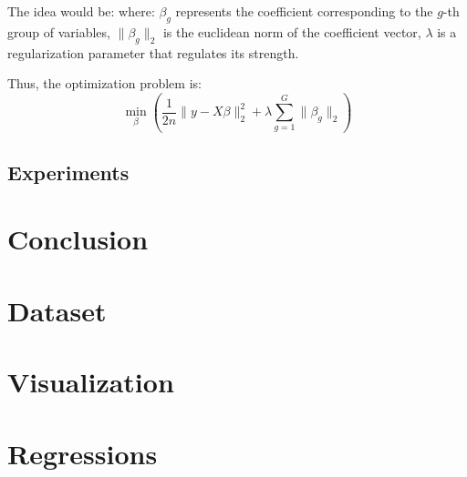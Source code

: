 \documentclass[a4paper, 8pt]{article}
\begin{document}
\begin{multicols}{2}
The idea would be: where: $\beta_g$ represents the coefficient corresponding to the $g$-th group of variables, $\lVert \beta_g \rVert_2$ is the euclidean norm of the coefficient vector, $\lambda$ is a regularization parameter that regulates its strength.

Thus, the optimization problem is:
\begin{equation}
\min_{\beta}\left (\frac{1}{2n}\lVert y-X\beta\rVert^{2}_{2} + \lambda \sum_{g=1}^{G}\lVert \beta_{g} \rVert_{2}\right)
\end{equation}

\subsection{Experiments}


\section{Conclusion}
\noindent

\end{multicols}


\pagebreak
\appendix

\section{Dataset}



\section{Visualization}

\section{Regressions}



% 
% 
\end{document}
